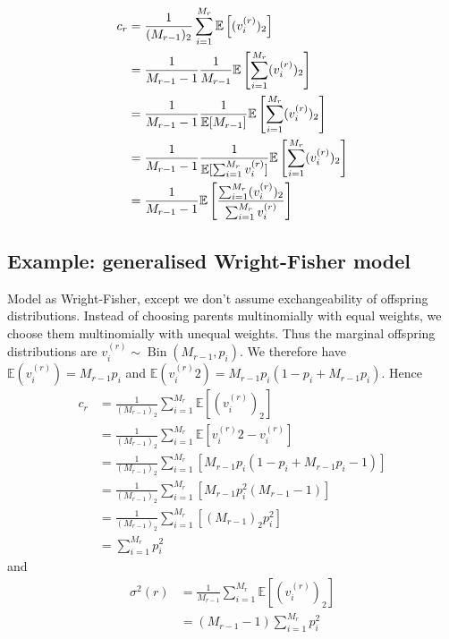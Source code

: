 \documentclass{article}
\newcommand{\E}{\mathbb{E}}
\begin{document}
\begin{align}
c_r &= \frac{1}{(M_{r-1})_2} \sum_{i=1}^{M_r} \E \left[ (v_i^{(r)})_2 \right] \label{eq:coal_prob1}\\
&= \frac{1}{M_{r-1}-1} \frac{1}{M_{r-1}} \E \left[ \sum_{i=1}^{M_r} (v_i^{(r)})_2 \right] \notag\\
&= \frac{1}{M_{r-1}-1} \frac{1}{\E[M_{r-1}]} \E \left[ \sum_{i=1}^{M_r} (v_i^{(r)})_2 \right] \notag\\
&= \frac{1}{M_{r-1}-1} \frac{1}{\E[ \sum_{i=1}^{M_r} v_i^{(r)}]} \E \left[ \sum_{i=1}^{M_r} (v_i^{(r)})_2 \right] \notag\\
&= \frac{1}{M_{r-1}-1} \E \left[  \frac{\sum_{i=1}^{M_r} (v_i^{(r)})_2}{\sum_{i=1}^{M_r} v_i^{(r)}}  \right] \label{eq:coal_prob2}
\end{align}


\subsection*{Example: generalised Wright-Fisher model}
Model as Wright-Fisher, except we don't assume exchangeability of offspring distributions. Instead of choosing parents multinomially with equal weights, we choose them multinomially with unequal weights. 
Thus the marginal offspring distributions are 
$v_i^{(r)} \sim \operatorname{Bin}(M_{r-1}, p_i)$.
We therefore have $\E(v_i^{(r)}) = M_{r-1}p_i$ and $\E(v_i^{(r)}2) = M_{r-1}p_i(1-p_i+M_{r-1}p_i)$. Hence
\begin{align*}
c_r &= \frac{1}{(M_{r-1})_2} \sum_{i=1}^{M_r} \E[(v_i^{(r)})_2] \\
&= \frac{1}{(M_{r-1})_2} \sum_{i=1}^{M_r} \E[v_i^{(r)}2 - v_i^{(r)}] \\
&= \frac{1}{(M_{r-1})_2} \sum_{i=1}^{M_r} [M_{r-1}p_i (1-p_i + M_{r-1}p_i -1 )] \\
&= \frac{1}{(M_{r-1})_2} \sum_{i=1}^{M_r} [M_{r-1}p_i^2 (M_{r-1} -1 )] \\
&= \frac{1}{(M_{r-1})_2} \sum_{i=1}^{M_r} [(M_{r-1})_2 p_i^2] \\
&= \sum_{i=1}^{M_r} p_i^2
\end{align*}
and
\begin{align*}
\sigma^2(r) &= \frac{1}{M_{r-1}} \sum_{i=1}^{M_r} \E[(v_i^{(r)})_2] \\
&= (M_{r-1}-1)\sum_{i=1}^{M_r} p_i^2
\end{align*}
\end{document}
